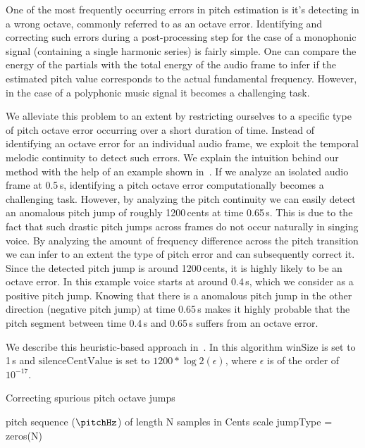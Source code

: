 {One of the most frequently occurring errors in pitch estimation is it's detecting in a wrong octave, commonly referred to as an octave error. Identifying and correcting such errors during a post-processing step for the case of a monophonic signal (containing a single harmonic series) is fairly simple. One can compare the energy of the partials with the total energy of the audio frame to infer if the estimated pitch value corresponds to the actual fundamental frequency. However, in the case of a polyphonic music signal it becomes a challenging task. 

We alleviate this problem to an extent by restricting ourselves to a specific type of pitch octave error occurring over a short duration of time. Instead of identifying an octave error for an individual audio frame, we exploit the temporal melodic continuity to detect such errors. We explain the intuition behind our method with the help of an example shown in~. If we analyze an isolated audio frame at 0.5\,s, identifying a pitch octave error computationally becomes a challenging task. However, by analyzing the pitch continuity we can easily detect an anomalous pitch jump of roughly 1200\,cents at time 0.65\,s. This is due to the fact that such drastic pitch jumps across frames do not occur naturally in singing voice. By analyzing the amount of frequency difference across the pitch transition we can infer to an extent the type of pitch error and can subsequently correct it. Since the detected pitch jump is around 1200\,cents, it is highly likely to be an octave error. In this example voice starts at around 0.4\,s, which we consider as a positive pitch jump. Knowing that there is a anomalous pitch jump in the other direction (negative pitch jump) at time 0.65\,s makes it highly probable that the pitch segment between time 0.4\,s and 0.65\,s suffers from an octave error.  

We describe this heuristic-based approach in~. In this algorithm $\mathrm{winSize}$ is set to 1\,s and $\mathrm{silenceCentValue}$ is set to $1200*\log2(\epsilon)$, where $\epsilon$ is of the order of $10^{-17}$.


\renewcommand{\algorithmiccomment}[1]{\bgroup\hfill\tiny//~#1\egroup}

\begin{algorithm}
	\caption{Correcting spurious pitch octave jumps}
	\label{alg:algorithmPitchCorrection}
	\begin{algorithmic}  
		 pitch sequence ($\pitchHz$) of length N samples in Cents scale
		\State jumpType = zeros(N)	
		

\end{algorithmic}
\end{algorithm}}

